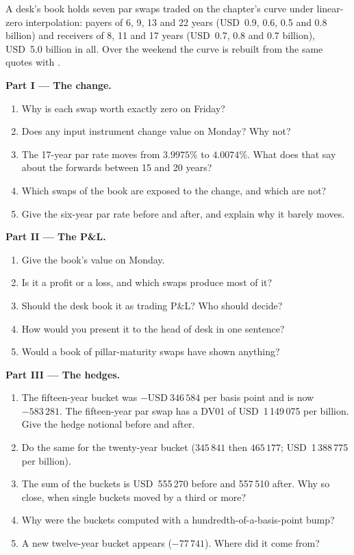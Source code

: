 \begin{problem}\label{pb:rc:curve-construction:1}
A desk's book holds seven par swaps traded on the chapter's curve under
linear-zero interpolation: payers of 6, 9, 13 and 22 years (USD~0.9, 0.6, 0.5
and 0.8 billion) and receivers of 8, 11 and 17 years (USD~0.7, 0.8 and 0.7
billion), USD~5.0 billion in all. Over the weekend the curve is rebuilt from
the same quotes with .

\medskip\noindent\textbf{Part I --- The change.}
\begin{enumerate}
\item Why is each swap worth exactly zero on Friday?
\item Does any input instrument change value on Monday? Why not?
\item The 17-year par rate moves from $3.9975\%$ to $4.0074\%$. What does that
say about the forwards between 15 and 20 years?
\item Which swaps of the book are exposed to the change, and which are not?
\item Give the six-year par rate before and after, and explain why it barely
moves.
\end{enumerate}

\medskip\noindent\textbf{Part II --- The P\&L.}
\begin{enumerate}[resume]
\item Give the book's value on Monday.
\item Is it a profit or a loss, and which swaps produce most of it?
\item Should the desk book it as trading P\&L? Who should decide?
\item How would you present it to the head of desk in one sentence?
\item Would a book of pillar-maturity swaps have shown anything?
\end{enumerate}

\medskip\noindent\textbf{Part III --- The hedges.}
\begin{enumerate}[resume]
\item The fifteen-year bucket was $-\text{USD}~346\,584$ per basis point and is now
$-583\,281$. The fifteen-year par swap has a DV01 of USD~1\,149\,075 per billion.
Give the hedge notional before and after.
\item Do the same for the twenty-year bucket ($345\,841$ then $465\,177$; USD~1\,388\,775
per billion).
\item The sum of the buckets is USD~555\,270 before and 557\,510 after. Why so
close, when single buckets moved by a third or more?
\item Why were the buckets computed with a hundredth-of-a-basis-point bump?
\item A new twelve-year bucket appears ($-77\,741$). Where did it come from?
\end{enumerate}


\end{problem}
